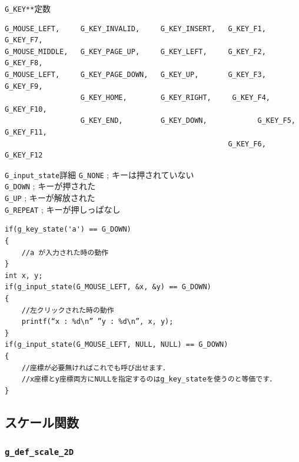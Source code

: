 \documentclass[platex,a4paper,12pt]{jsarticle}%
\begin{document}
\begin{itembox}[l]{\texttt{G\_KEY**}定数}
\begin{verbatim}
G_MOUSE_LEFT,     G_KEY_INVALID,     G_KEY_INSERT,   G_KEY_F1, 	G_KEY_F7,
G_MOUSE_MIDDLE,   G_KEY_PAGE_UP,     G_KEY_LEFT,     G_KEY_F2, 	G_KEY_F8,
G_MOUSE_LEFT,     G_KEY_PAGE_DOWN,   G_KEY_UP,       G_KEY_F3, 	G_KEY_F9,
                  G_KEY_HOME,        G_KEY_RIGHT, 	  G_KEY_F4, 	G_KEY_F10,
                  G_KEY_END,         G_KEY_DOWN,	    	G_KEY_F5, 	G_KEY_F11,
                                                     G_KEY_F6,	  G_KEY_F12
 \end{verbatim}
\end{itembox}
\begin{itembox}[l]{\texttt{G\_input\_state}詳細}
\verb|G_NONE| ; キーは押されていない\\
\verb|G_DOWN| ; キーが押された\\
\verb|G_UP| ; キーが解放された\\
\verb|G_REPEAT| ; キーが押しっぱなし
\begin{verbatim}
if(g_key_state('a') == G_DOWN)
{
    //a が入力された時の動作
}
int x, y;
if(g_input_state(G_MOUSE_LEFT, &x, &y) == G_DOWN)
{
    //左クリックされた時の動作
    printf(“x : %d\n” ”y : %d\n”, x, y);
}
if(g_input_state(G_MOUSE_LEFT, NULL, NULL) == G_DOWN)
{
    //座標が必要無ければこれでも呼び出せます．
    //x座標とy座標両方にNULLを指定するのはg_key_stateを使うのと等価です．
}
\end{verbatim}
\end{itembox}

\clearpage
\subsection{スケール関数}

\subsubsection{\texttt{g\_def\_scale\_2D}}
\label{g_def_scale_2D}
\end{document}
